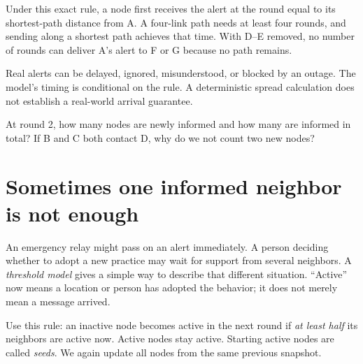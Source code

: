 \documentclass[11pt,letterpaper]{article}
\begin{document}
Under this exact rule, a node first receives the alert at the round equal to its shortest-path distance from A. A four-link path needs at least four rounds, and sending along a shortest path achieves that time. With D--E removed, no number of rounds can deliver A's alert to F or G because no path remains.



Real alerts can be delayed, ignored, misunderstood, or blocked by an outage. The model's timing is conditional on the rule. A deterministic spread calculation does not establish a real-world arrival guarantee.



\begin{tcolorbox}[title={Pause and try 8},breakable]
At round 2, how many nodes are newly informed and how many are informed in total? If B and C both contact D, why do we not count two new nodes?
\end{tcolorbox}


\clearpage

\section{Sometimes one informed neighbor is not enough}


An emergency relay might pass on an alert immediately. A person deciding whether to adopt a new practice may wait for support from several neighbors. A \emph{threshold model} gives a simple way to describe that different situation. ``Active'' now means a location or person has adopted the behavior; it does not merely mean a message arrived.



Use this rule: an inactive node becomes active in the next round if \emph{at least half} its neighbors are active now. Active nodes stay active. Starting active nodes are called \emph{seeds}. We again update all nodes from the same previous snapshot.



\par{}\par\medskip
\end{document}
